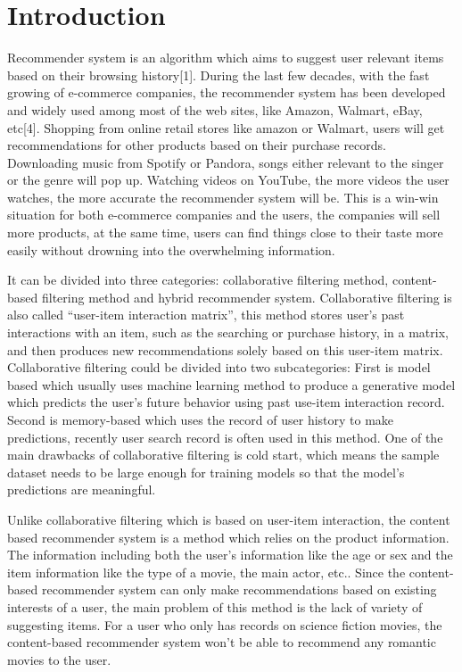 \documentclass[conference]{IEEEtran}
\begin{document}
\section{Introduction}

Recommender system is an algorithm which aims to suggest user relevant items based on their browsing history[1]. During the last few decades, with the fast growing of e-commerce companies, the recommender system has been developed and widely used among most of the web sites, like Amazon, Walmart, eBay, etc[4]. Shopping from online retail stores like amazon or Walmart, users will get recommendations for other products based on their purchase records. Downloading music from Spotify or Pandora, songs either relevant to the singer or the genre will pop up. Watching videos on YouTube, the more videos the user watches, the more  accurate the recommender system will be. This is a win-win situation for both e-commerce companies and the users, the companies will sell more products, at the same time, users can find things close to their taste more easily without drowning into the overwhelming information.

It can be divided into three categories: collaborative filtering method, content-based filtering method and hybrid recommender system\cite{DL_overview}. Collaborative filtering is also called “user-item interaction matrix”, this method stores user’s past interactions with an item, such as the searching or purchase history, in a matrix, and then produces new recommendations solely based on this user-item matrix. Collaborative filtering could be divided into two subcategories: First is model based which usually uses machine learning method to produce a generative model which predicts the user’s future behavior using past use-item interaction record. Second is memory-based which uses the record of user history to make predictions, recently user search record is often used in this method. One of the main drawbacks of collaborative filtering is cold start, which means the sample dataset needs to be large enough for training models so that the model’s predictions are meaningful.

Unlike collaborative filtering which is based on user-item interaction, the content based recommender system is a method which relies on the product information. The information including both the user’s information like the age or sex and the item information like the type of a movie, the main actor, etc.. Since the content-based recommender system can only make recommendations based on existing interests of a user, the main problem of this method is the lack of variety of suggesting items. For a user who only has records on science fiction movies, the content-based recommender system won't be able to recommend any romantic movies to the user. 
\end{document}
